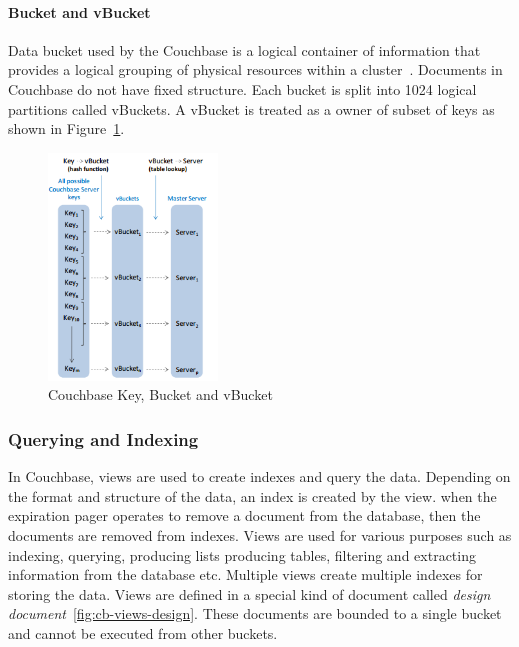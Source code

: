 \paragraph{Bucket and vBucket}
 Data bucket used by the Couchbase is a logical container of information that provides a logical grouping of physical resources within a cluster~\citep{lichtenberg2013nosql}. Documents in Couchbase do not have fixed structure. Each bucket is split into 1024 logical partitions called vBuckets. A vBucket is treated as a owner of subset of keys as shown in Figure~\ref{fig:cb-vbucket}.  

\begin{figure}[h]
	\centering
	\includegraphics[width=0.4\textwidth]{img/vbucket2}
	\caption{ Couchbase Key, Bucket and   vBucket ~\cite{couchbasedocs}}
	\label{fig:cb-vbucket}
\end{figure}




\subsubsection{Querying and Indexing}

 In Couchbase, views are used to create indexes and query the data. Depending on the format and structure of the data, an index is created by the view. when the expiration pager operates to remove a document from the database, then the documents are removed from indexes. Views are used for various purposes such as indexing, querying, producing lists producing tables, filtering and extracting information from the database etc. Multiple views create multiple indexes for storing the data. Views are defined in a special kind of document called \textit{design document}~\ref{fig:cb-views-design}. These documents are bounded to a single bucket and cannot be executed from other buckets. 
 
